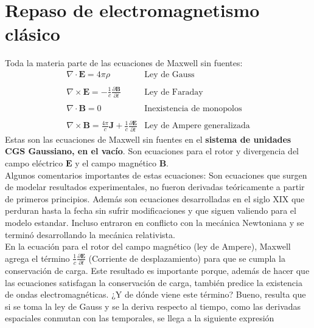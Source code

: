 \section{Repaso de electromagnetismo clásico}
Toda la materia parte de las ecuaciones de Maxwell sin fuentes:
\begin{equation}
    \begin{matrix}
        \nabla \cdot \textbf{E} = 4\pi\rho 
        & \mbox{Ley de Gauss}\\
        &\\
        \nabla \times \textbf{E} = -\frac{1}{c}\frac{\partial \textbf{B}}{\partial t}
        & \mbox{Ley de Faraday}\\
        &\\
        \nabla \cdot \textbf{B} = 0 
        & \mbox{Inexistencia de monopolos}\\
        &\\
        \nabla \times \textbf{B} = \frac{4\pi}{c}\textbf{J} + \frac{1}{c}\frac{\partial \textbf{E}}{\partial t}
        & \mbox{Ley de Ampere generalizada}
        
    \end{matrix}
    \label{ec:EcuacionesDeMaxwell}
\end{equation}
Estas son las ecuaciones de Maxwell sin fuentes en el \textbf{sistema de unidades CGS Gaussiano, en el vacío}. Son ecuaciones para el rotor y divergencia del campo eléctrico $\textbf{E}$ y el campo magnético $\textbf{B}$. \\
\indent Algunos comentarios importantes de estas ecuaciones: Son ecuaciones que surgen de modelar resultados experimentales, no fueron derivadas teóricamente a partir de primeros principios. Además son ecuaciones desarrolladas en el siglo XIX que perduran hasta la fecha sin sufrir modificaciones y que siguen valiendo para el modelo estandar. Incluso entraron en conflicto con la mecánica Newtoniana y se terminó desarrollando la mecánica relativista.\\
\indent En la ecuación para el rotor del campo magnético (ley de Ampere), Maxwell agrega el término $\frac{1}{c}\frac{\partial \textbf{E}}{\partial t}$ (Corriente de desplazamiento) para que se cumpla la conservación de carga. Este resultado es importante porque, además de hacer que las ecuaciones satisfagan la conservación de carga, también predice la existencia de ondas electromagnéticas. ¿Y de dónde viene este término? Bueno, resulta que si se toma la ley de Gauss y se la deriva respecto al tiempo, como las derivadas espaciales conmutan con las temporales, se llega a la siguiente expresión
